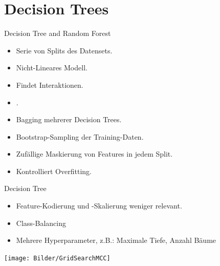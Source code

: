 \section{Decision Trees}

\begin{frame}{Decision Tree and Random Forest}
{
\begin{itemize}
\item Serie von Splits des Datensets.
\item Nicht-Lineares Modell.
\item Findet Interaktionen.
\item {}.
\end{itemize}
}
{
\begin{itemize}
\item Bagging mehrerer Decision Trees.
\item Bootstrap-Sampling der Training-Daten.
\item Zufällige Maskierung von Features in jedem Split.
\item Kontrolliert Overfitting.
\end{itemize}
}
\end{frame}

\begin{frame}{Decision Tree}
{
\begin{itemize}
\item Feature-Kodierung und -Skalierung weniger relevant.
\item Class-Balancing
\item Mehrere Hyperparameter, z.B.: Maximale Tiefe, Anzahl Bäume
\end{itemize}
}
\centering
\texttt{[image: Bilder/GridSearchMCC]} 
\end{frame}

